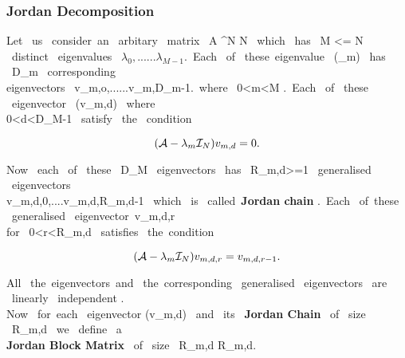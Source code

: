 \documentclass[12pt,onecolumn]{article}
\begin{document}
\subsubsection{\textbf{Jordan Decomposition}}
Let \ us \ consider\ an \ arbitary \ matrix \ A \in {}^{N \times N} \ which \ has \ M <= N \ distinct \ eigenvalues \ $ \lambda_{0},......\lambda_{M-1}.$\ Each \ of \ these\ eigenvalue \ (\lambda_{m}) \ has \ D_{m} \ corresponding \\ eigenvectors \ v_{m,o},......v_{m,D_{m}-1}.\ where \ 0<m<M .\ Each \ of \ these \ eigenvector \ (v_{m,d}) \ where \\ 0<d<D_{M}-1 \ satisfy \ the \ condition 

\begin{equation*}
    (\mathcal{A} - \lambda_{m}\mathcal{I}_{N})v_{m,d} = 0. \\ 
\end{equation*}

Now \ each \ of \ these \ D_{M} \ eigenvectors \ has \ R_{m,d}>=1  \ generalised  \ eigenvectors \\ v_{m,d,0},....v_{m,d,R_{m,d}-1} \ which \ is \ called\ \textbf{Jordan chain} .\ Each \ of\ these \ generalised \ eigenvector\ v_{m,d,r} \\ for \ 0<r<R_{m,d} \ satisfies \ the\ condition \ 

\begin{equation*}
    (\mathcal{A} - \lambda_{m}\mathcal{I}_{N})v_{m,d,r} = v_{m,d,r-1}. \\ 
\end{equation*}

All \ the\ eigenvectors\ and \ the\ corresponding \ generalised \ eigenvectors \ are \ linearly \ independent . \\
Now \ for\ each \ eigenvector (v_{m,d}) \ and \ its \ \textbf{Jordan Chain} \ of \ size \ R_{m,d} \ we \ define \ a \\ \textbf{Jordan Block Matrix} \ of \ size \   R_{m,d} \times R_{m,d}. \\
\end{document}
